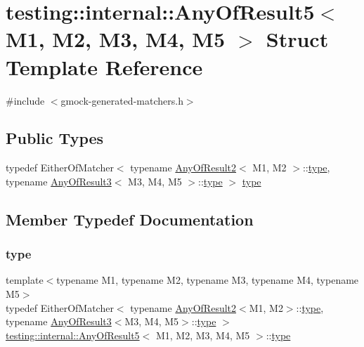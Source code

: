 \hypertarget{structtesting_1_1internal_1_1AnyOfResult5}{}\section{testing\+::internal\+::Any\+Of\+Result5$<$ M1, M2, M3, M4, M5 $>$ Struct Template Reference}
\label{structtesting_1_1internal_1_1AnyOfResult5}


{\ttfamily \#include $<$gmock-\/generated-\/matchers.\+h$>$}

\subsection*{Public Types}
\begin{DoxyCompactItemize}
\item 
typedef Either\+Of\+Matcher$<$ typename \mbox{\hyperlink{structtesting_1_1internal_1_1AnyOfResult2}{Any\+Of\+Result2}}$<$ M1, M2 $>$\+::\mbox{\hyperlink{structtesting_1_1internal_1_1AnyOfResult5_a459a06dc5791313dce942668714f0c99}{type}}, typename \mbox{\hyperlink{structtesting_1_1internal_1_1AnyOfResult3}{Any\+Of\+Result3}}$<$ M3, M4, M5 $>$\+::\mbox{\hyperlink{structtesting_1_1internal_1_1AnyOfResult5_a459a06dc5791313dce942668714f0c99}{type}} $>$ \mbox{\hyperlink{structtesting_1_1internal_1_1AnyOfResult5_a459a06dc5791313dce942668714f0c99}{type}}
\end{DoxyCompactItemize}


\subsection{Member Typedef Documentation}
\mbox{\label{structtesting_1_1internal_1_1AnyOfResult5_a459a06dc5791313dce942668714f0c99}} 
\subsubsection{\texorpdfstring{type}{type}}
{\footnotesize\ttfamily template$<$typename M1, typename M2, typename M3, typename M4, typename M5$>$ \\
typedef Either\+Of\+Matcher$<$ typename \mbox{\hyperlink{structtesting_1_1internal_1_1AnyOfResult2}{Any\+Of\+Result2}}$<$M1, M2$>$\+::\mbox{\hyperlink{structtesting_1_1internal_1_1AnyOfResult5_a459a06dc5791313dce942668714f0c99}{type}}, typename \mbox{\hyperlink{structtesting_1_1internal_1_1AnyOfResult3}{Any\+Of\+Result3}}$<$M3, M4, M5$>$\+::\mbox{\hyperlink{structtesting_1_1internal_1_1AnyOfResult5_a459a06dc5791313dce942668714f0c99}{type}} $>$ \mbox{\hyperlink{structtesting_1_1internal_1_1AnyOfResult5}{testing\+::internal\+::\+Any\+Of\+Result5}}$<$ M1, M2, M3, M4, M5 $>$\+::\mbox{\hyperlink{structtesting_1_1internal_1_1AnyOfResult5_a459a06dc5791313dce942668714f0c99}{type}}}



